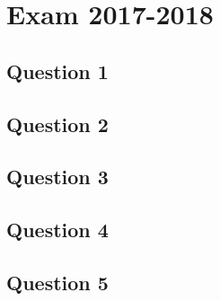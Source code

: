 \section{Exam 2017-2018}

\subsection{Question 1}
\subsection{Question 2}
\subsection{Question 3}
\subsection{Question 4}
\subsection{Question 5}